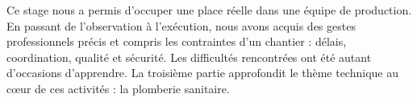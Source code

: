 \conclusionPartielle
Ce stage nous a permis d'occuper une place réelle dans une équipe de production. En passant de
l'observation à l'exécution, nous avons acquis des gestes professionnels précis et compris les
contraintes d'un chantier : délais, coordination, qualité et sécurité. Les difficultés
rencontrées ont été autant d'occasions d'apprendre. La troisième partie approfondit le thème
technique au cœur de ces activités : la plomberie sanitaire.
